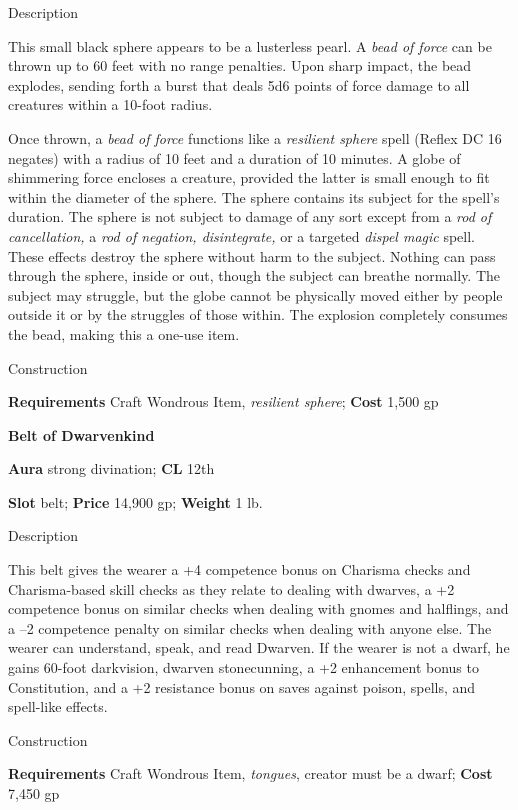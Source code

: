 Description
				
This small black sphere appears to be a lusterless pearl. A \textit{bead of force} can be thrown up to 60 feet with no range penalties. Upon sharp impact, the bead explodes, sending forth a burst that deals 5d6 points of force damage to all creatures within a 10-foot radius.
				
Once thrown, a \textit{bead of force} functions like a\textit{ resilient sphere }spell (Reflex DC 16 negates) with a radius of 10 feet and a duration of 10 minutes. A globe of shimmering force encloses a creature, provided the latter is small enough to fit within the diameter of the sphere. The sphere contains its subject for the spell's duration. The sphere is not subject to damage of any sort except from a \textit{rod of cancellation, }a \textit{rod of negation, disintegrate, }or a targeted \textit{dispel magic }spell. These effects destroy the sphere without harm to the subject. Nothing can pass through the sphere, inside or out, though the subject can breathe normally. The subject may struggle, but the globe cannot be physically moved either by people outside it or by the struggles of those within. The explosion completely consumes the bead, making this a one-use item. 
				
Construction
				
\textbf{Requirements} Craft Wondrous Item, \textit{resilient sphere}; \textbf{Cost }1,500 gp
				
\textbf{Belt of Dwarvenkind}
				
\textbf{Aura} strong divination;\textbf{ CL }12th
				
\textbf{Slot} belt; \textbf{Price} 14,900 gp; \textbf{Weight} 1 lb.
				
Description
				
This belt gives the wearer a +4 competence bonus on Charisma checks and Charisma-based skill checks as they relate to dealing with dwarves, a +2 competence bonus on similar checks when dealing with gnomes and halflings, and a --2 competence penalty on similar checks when dealing with anyone else. The wearer can understand, speak, and read Dwarven. If the wearer is not a dwarf, he gains 60-foot darkvision, dwarven stonecunning, a +2 enhancement bonus to Constitution, and a +2 resistance bonus on saves against poison, spells, and spell-like effects. 
				
Construction
				
\textbf{Requirements} Craft Wondrous Item, \textit{tongues}, creator must be a dwarf; \textbf{Cost }7,450 gp
				
